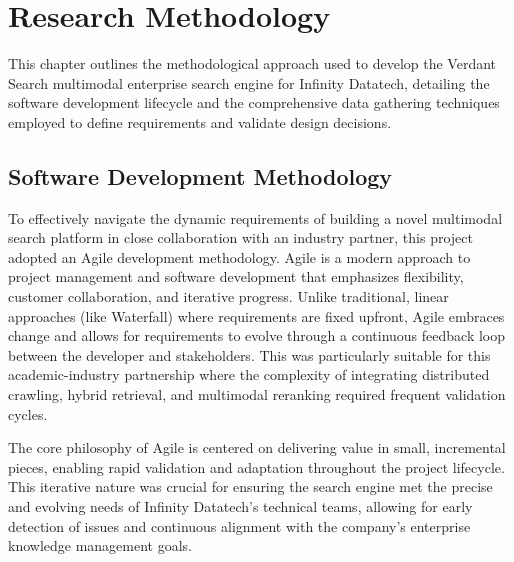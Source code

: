 \documentclass{report}
\begin{document}
\tableofcontents
\clearpage

\listoftables
\clearpage

\listoffigures
\clearpage





\chapter{Research Methodology}
This chapter outlines the methodological approach used to develop the Verdant Search multimodal enterprise search engine for Infinity Datatech, detailing the software development lifecycle and the comprehensive data gathering techniques employed to define requirements and validate design decisions.

\section{Software Development Methodology}

To effectively navigate the dynamic requirements of building a novel multimodal search platform in close collaboration with an industry partner, this project adopted an Agile development methodology. Agile is a modern approach to project management and software development that emphasizes flexibility, customer collaboration, and iterative progress. Unlike traditional, linear approaches (like Waterfall) where requirements are fixed upfront, Agile embraces change and allows for requirements to evolve through a continuous feedback loop between the developer and stakeholders. This was particularly suitable for this academic-industry partnership where the complexity of integrating distributed crawling, hybrid retrieval, and multimodal reranking required frequent validation cycles.

The core philosophy of Agile is centered on delivering value in small, incremental pieces, enabling rapid validation and adaptation throughout the project lifecycle. This iterative nature was crucial for ensuring the search engine met the precise and evolving needs of Infinity Datatech's technical teams, allowing for early detection of issues and continuous alignment with the company's enterprise knowledge management goals.
\end{document}
